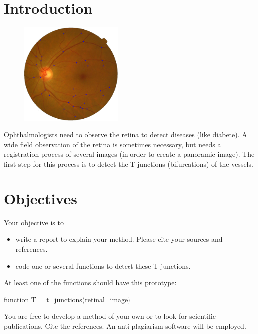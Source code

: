 
\section{Introduction}
\begin{figure}
 \includegraphics[width=5cm]{im1_points}
\end{figure}
Ophthalmologists need to observe the retina to detect diseases (like diabete). A wide field observation
of the retina is sometimes necessary, but needs a registration process of several images (in order to create a panoramic 
image). The first step for this process is to detect the T-junctions (bifurcations) of the vessels.

\section{Objectives}

Your objective is to 

\begin{itemize}
\item write a report to explain your method. Please cite your sources and references.
 \item code one or several \matlabregistered{} functions to detect these T-junctions. 
\end{itemize}


At least one of the functions should have this prototype:
\begin{matlab}
function T = t_junctions(retinal_image)
\end{matlab}
You are free to develop a method of your own or to look for scientific publications.
Cite the references. An anti-plagiarism software will be employed.
